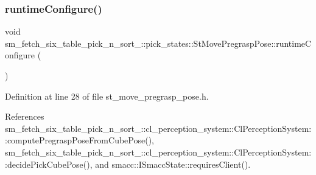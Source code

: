 \subsubsection{\texorpdfstring{runtime\+Configure()}{runtimeConfigure()}}
{\footnotesize\ttfamily void sm\+\_\+fetch\+\_\+six\+\_\+table\+\_\+pick\+\_\+n\+\_\+sort\+\_\+::pick\+\_\+states\+::\+St\+Move\+Pregrasp\+Pose\+::runtime\+Configure (\begin{DoxyParamCaption}{ }\end{DoxyParamCaption})\hspace{0.3cm}{\ttfamily [inline]}}



Definition at line 28 of file st\+\_\+move\+\_\+pregrasp\+\_\+pose.\+h.



References sm\+\_\+fetch\+\_\+six\+\_\+table\+\_\+pick\+\_\+n\+\_\+sort\+\_\+::cl\+\_\+perception\+\_\+system\+::\+Cl\+Perception\+System\+::compute\+Pregrasp\+Pose\+From\+Cube\+Pose(), sm\+\_\+fetch\+\_\+six\+\_\+table\+\_\+pick\+\_\+n\+\_\+sort\+\_\+::cl\+\_\+perception\+\_\+system\+::\+Cl\+Perception\+System\+::decide\+Pick\+Cube\+Pose(), and smacc\+::\+I\+Smacc\+State\+::requires\+Client().


